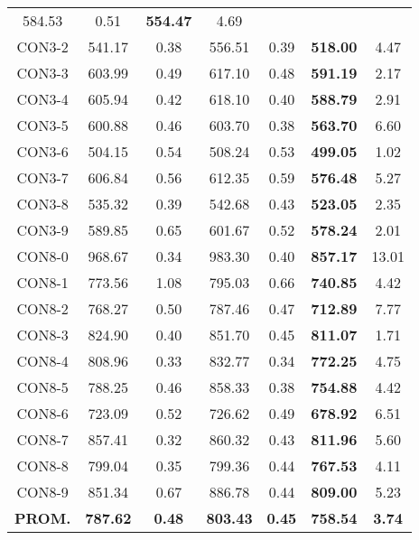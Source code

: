 \begin{table}[ht]
\begin{tabular}{c c c c c c c}
584.53 & 0.51 & \bf{554.47} & 
4.69\\CON3-2 & 541.17 & 0.38 & 
556.51 & 0.39 & \bf{518.00} & 
4.47\\CON3-3 & 603.99 & 0.49 & 
617.10 & 0.48 & \bf{591.19} & 
2.17\\CON3-4 & 605.94 & 0.42 & 
618.10 & 0.40 & \bf{588.79} & 
2.91\\CON3-5 & 600.88 & 0.46 & 
603.70 & 0.38 & \bf{563.70} & 
6.60\\CON3-6 & 504.15 & 0.54 & 
508.24 & 0.53 & \bf{499.05} & 
1.02\\CON3-7 & 606.84 & 0.56 & 
612.35 & 0.59 & \bf{576.48} & 
5.27\\CON3-8 & 535.32 & 0.39 & 
542.68 & 0.43 & \bf{523.05} & 
2.35\\CON3-9 & 589.85 & 0.65 & 
601.67 & 0.52 & \bf{578.24} & 
2.01\\CON8-0 & 968.67 & 0.34 & 
983.30 & 0.40 & \bf{857.17} & 
13.01\\CON8-1 & 773.56 & 1.08 & 
795.03 & 0.66 & \bf{740.85} & 
4.42\\CON8-2 & 768.27 & 0.50 & 
787.46 & 0.47 & \bf{712.89} & 
7.77\\CON8-3 & 824.90 & 0.40 & 
851.70 & 0.45 & \bf{811.07} & 
1.71\\CON8-4 & 808.96 & 0.33 & 
832.77 & 0.34 & \bf{772.25} & 
4.75\\CON8-5 & 788.25 & 0.46 & 
858.33 & 0.38 & \bf{754.88} & 
4.42\\CON8-6 & 723.09 & 0.52 & 
726.62 & 0.49 & \bf{678.92} & 
6.51\\CON8-7 & 857.41 & 0.32 & 
860.32 & 0.43 & \bf{811.96} & 
5.60\\CON8-8 & 799.04 & 0.35 & 
799.36 & 0.44 & \bf{767.53} & 
4.11\\CON8-9 & 851.34 & 0.67 & 
886.78 & 0.44 & \bf{809.00} & 
5.23\\\bf{PROM.} & 
\bf{787.62} & \bf{0.48} & \bf{803.43} & \bf{0.45} & \bf{758.54} & \bf{3.74}\\[1ex]\hline
\end{tabular}
\label{table:nonlin}
\end{table} \clearpage
